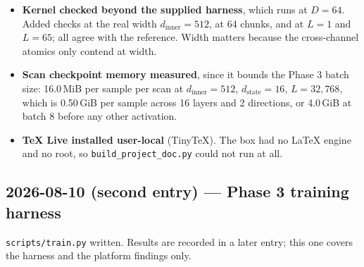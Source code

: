 \documentclass[11pt,a4paper]{article}
\newcommand{\code}[1]{\texttt{\small #1}}
\begin{document}
\begin{itemize}
\item \textbf{Kernel checked beyond the supplied harness}, which runs at
$D=64$. Added checks at the real width $d_{\text{inner}}=512$, at 64 chunks,
and at $L=1$ and $L=65$; all agree with the reference. Width matters because
the cross-channel atomics only contend at width.
\item \textbf{Scan checkpoint memory measured}, since it bounds the Phase 3
batch size: 16.0\,MiB per sample per scan at $d_{\text{inner}}=512$,
$d_{\text{state}}=16$, $L=32{,}768$, which is 0.50\,GiB per sample across 16
layers and 2 directions, or 4.0\,GiB at batch 8 before any other activation.
\item \textbf{TeX Live installed user-local} (TinyTeX). The box had no LaTeX
engine and no root, so \code{build\_project\_doc.py} could not run at all.
\end{itemize}

\subsection*{2026-08-10 (second entry) --- Phase 3 training harness}

\code{scripts/train.py} written. Results are recorded in a later entry; this one
covers the harness and the platform findings only.
\end{document}
